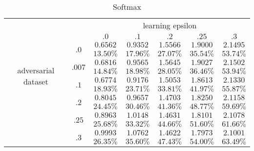 		\begin{table}[h]
		\centering
		        \begin{tabular}{cc||ccccc}

		        	& &  \multicolumn{5}{c}{learning epsilon} \\
		        	& &  $.0$ & $.1$ & $.2$ & $.25$ & $.3$ \\
		            \hline \hline
		            \multirow{8}{*}{adversarial dataset} 
		            	& \multirow{2}{*}{$.0$}  &$0.6562 	$&$0.9352 	$&$1.5566 	$&$1.9000 	$&$2.1495 	$  \\  
		            	&                        &$13.50\%	$&$17.96\%	$&$27.07\%	$&$35.54\%	$&$53.74\%	$  \\ \cline{2-7} 
		            	& \multirow{2}{*}{$.007$}&$0.6816 	$&$0.9565 	$&$1.5645 	$&$1.9027 	$&$2.1502 	$  \\  
		            	&                        &$14.84\%	$&$18.98\%	$&$28.05\%	$&$36.46\%	$&$53.94\%	$  \\ \cline{2-7} 
		            	& \multirow{2}{*}{$.1$}  &$0.6774 	$&$0.9176 	$&$1.5053 	$&$1.8613 	$&$2.1330 	$  \\ 
		            	&                        &$18.93\%	$&$23.71\%	$&$33.81\%	$&$41.97\%	$&$55.87\%	$  \\ \cline{2-7}
		                & \multirow{2}{*}{$.2$}  &$0.8045 	$&$0.9657 	$&$1.4703 	$&$1.8250 	$&$2.1158 	$  \\ 
		                &                        &$24.45\%	$&$30.46\%	$&$41.36\%	$&$48.77\%	$&$59.69\%	$  \\ \cline{2-7}
		                & \multirow{2}{*}{$.25$} &$0.8963 	$&$1.0148 	$&$1.4631 	$&$1.8101 	$&$2.1078 	$  \\ 
		                &                        &$25.68\%	$&$33.32\%	$&$44.66\%	$&$51.60\%	$&$61.66\%	$  \\ \cline{2-7}
		                & \multirow{2}{*}{$.3$}  &$0.9993 	$&$1.0762 	$&$1.4622 	$&$1.7973 	$&$2.1001 	$  \\ 
		                &                        &$26.35\%	$&$35.60\%	$&$47.43\%	$&$54.00\%	$&$63.49\%	$  \\ 

		            
		        \end{tabular}
		    \caption{Softmax}
		    \label{tab:xxx}
		\end{table}

